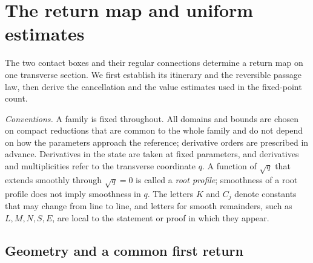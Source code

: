 \section{The return map and uniform estimates}
\label{sec:passage}

The two contact boxes and their regular connections determine a return map on
one transverse section. We first establish its itinerary and the reversible
passage law, then derive the cancellation and the value estimates used in the
fixed-point count.

\emph{Conventions.} A family is fixed throughout. All domains and bounds are
chosen on compact reductions that are common to the whole family and do not
depend on how the parameters approach the reference; derivative orders are
prescribed in advance. Derivatives in the state are taken at fixed parameters,
and derivatives and multiplicities refer to the transverse coordinate $q$. A
function of $\sqrt q$ that extends smoothly through $\sqrt q=0$ is called a
\emph{root profile}; smoothness of a root profile does not imply smoothness in
$q$. The letters $K$ and $C_j$ denote constants that may change from line to
line, and letters for smooth remainders, such as $L,M,N,S,E$, are local to the
statement or proof in which they appear.

\subsection{Geometry and a common first return}
\label{subsec:observed-controls}

